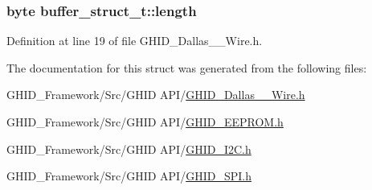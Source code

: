 \hypertarget{structbuffer__struct__t_a812251f18d1b5b93fed46984ed8d7cf1}{
\subsubsection[{length}]{\setlength{\rightskip}{0pt plus 5cm}byte {\bf buffer\-\_\-struct\-\_\-t\-::length}}}\label{structbuffer__struct__t_a812251f18d1b5b93fed46984ed8d7cf1}


\-Definition at line 19 of file \-G\-H\-I\-D\-\_\-\-Dallas\-\_\-\_\-\-Wire.\-h.



\-The documentation for this struct was generated from the following files\-:\begin{DoxyCompactItemize}
\item 
\-G\-H\-I\-D\-\_\-\-Framework/\-Src/\-G\-H\-I\-D A\-P\-I/\hyperlink{_g_h_i_d___dallas__1___wire_8h}{\-G\-H\-I\-D\-\_\-\-Dallas\-\_\-\_\-\-Wire.\-h}\item 
\-G\-H\-I\-D\-\_\-\-Framework/\-Src/\-G\-H\-I\-D A\-P\-I/\hyperlink{_g_h_i_d___e_e_p_r_o_m_8h}{\-G\-H\-I\-D\-\_\-\-E\-E\-P\-R\-O\-M.\-h}\item 
\-G\-H\-I\-D\-\_\-\-Framework/\-Src/\-G\-H\-I\-D A\-P\-I/\hyperlink{_g_h_i_d___i2_c_8h}{\-G\-H\-I\-D\-\_\-\-I2\-C.\-h}\item 
\-G\-H\-I\-D\-\_\-\-Framework/\-Src/\-G\-H\-I\-D A\-P\-I/\hyperlink{_g_h_i_d___s_p_i_8h}{\-G\-H\-I\-D\-\_\-\-S\-P\-I.\-h}\end{DoxyCompactItemize}
